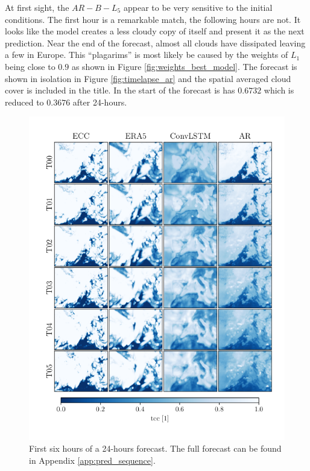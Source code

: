 At first sight, the $AR-B-L_5$ appear to be very sensitive to the initial conditions. The first hour is a remarkable match, the following hours are not. It looks like the model creates a less cloudy copy of itself and present it as the next prediction. Near the end of the forecast, almost all clouds have dissipated leaving a few in Europe. This ``plagarims'' is most likely be caused by the weights of $L_1$ being close to $0.9$ as shown in Figure \ref{fig:weights_best_model}. The forecast is shown in isolation in Figure \ref{fig:timelapse_ar} and the spatial averaged cloud cover is included in the title. In the start of the forecast is has $0.6732$ which is reduced to $0.3676$ after 24-hours.
\begin{figure}[ht]
    \centering
    \includegraphics[sale=0.1]{python_figs/comparing_seq_part_1_of4_jan2.png}
    \caption{First six hours of a 24-hours forecast. The full forecast can be found in Appendix \ref{app:pred_sequence}.}
    \label{fig:pred_sequence}
\end{figure}

